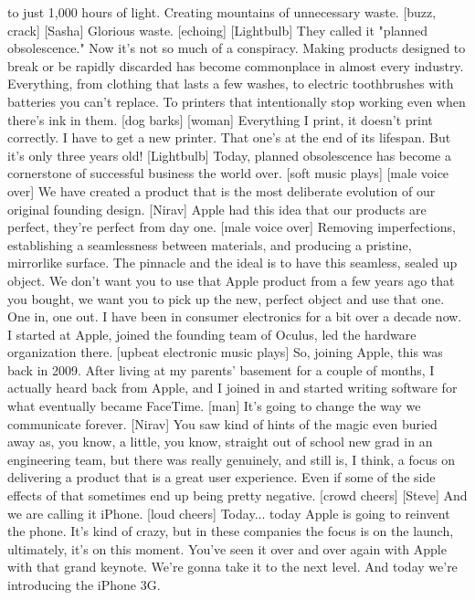 \documentclass[a4paper]{article}
\begin{document}
	to just 1,000 hours of light.
	Creating mountains of unnecessary waste.
	[buzz, crack]
	[Sasha] Glorious waste. [echoing]
	[Lightbulb] They called it "planned obsolescence."
	Now it's not so much of a conspiracy.
	Making products designed to break or be rapidly discarded
	has become commonplace in almost every industry.
	Everything, from clothing that lasts a few washes,
	to electric toothbrushes with batteries you can't replace.
	To printers that intentionally stop working even when there's ink in them.
	[dog barks]
	[woman] Everything I print, it doesn't print correctly.
	I have to get a new printer. That one's at the end of its lifespan.
	But it's only three years old!
	[Lightbulb] Today, planned obsolescence has become
	a cornerstone of successful business the world over.
	[soft music plays]
	[male voice over] We have created a product
	that is the most deliberate evolution of our original founding design.
	[Nirav] Apple had this idea that our products are perfect,
	they're perfect from day one.
	[male voice over] Removing imperfections, establishing a seamlessness
	between materials,
	and producing a pristine, mirrorlike surface.
	The pinnacle and the ideal is to have this seamless, sealed up object.
	We don't want you to use that Apple product from a few years ago
	that you bought,
	we want you to pick up the new, perfect object and use that one.
	One in, one out.
	I have been in consumer electronics for a bit over a decade now.
	I started at Apple,
	joined the founding team of Oculus, led the hardware organization there.
	[upbeat electronic music plays]
	So, joining Apple, this was back in 2009.
	After living at my parents' basement for a couple of months,
	I actually heard back from Apple,
	and I joined in and started writing software
	for what eventually became FaceTime.
	[man] It's going to change the way we communicate forever.
	[Nirav] You saw kind of hints of the magic even buried away as, you know, a little,
	you know, straight out of school new grad in an engineering team,
	but there was really genuinely, and still is, I think,
	a focus on delivering a product that is a great user experience.
	Even if some of the side effects of that sometimes end up being pretty negative.
	[crowd cheers]
	[Steve] And we are calling it iPhone.
	[loud cheers]
	Today...
	today Apple is going to reinvent the phone.
	It's kind of crazy, but in these companies
	the focus is on the launch, ultimately, it's on this moment.
	You've seen it over and over again with Apple with that grand keynote.
	We're gonna take it to the next level.
	And today we're introducing the iPhone 3G.
\end{document}
